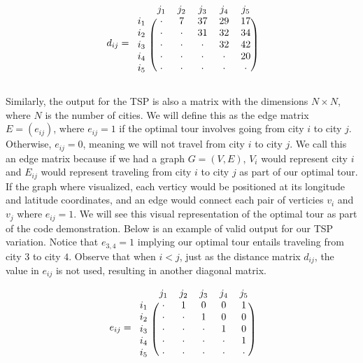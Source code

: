 \documentclass{article}
\begin{document}
\begin{align*}
  d_{ij}=
  \begin{blockarray}{cccccc}
    & j_1 & j_2 & j_3 & j_4 & j_5 \\
  \begin{block}{c(ccccc)}
    i_1 & \cdot & 7 & 37 & 29 & 17 \\
    i_2 & \cdot & \cdot & 31 & 32 & 34 \\
    i_3 & \cdot & \cdot & \cdot & 32 & 42 \\
    i_4 & \cdot & \cdot & \cdot & \cdot & 20 \\
    i_5 & \cdot & \cdot & \cdot & \cdot & \cdot \\
  \end{block}
  \end{blockarray}
\end{align*}

Similarly, the output for the TSP is also a matrix with the dimensions
$N\times N$, where $N$ is the number of cities.  We will define this as
the edge matrix $E = (e_{ij})$, where $e_{ij}=1$ if the optimal tour involves
going from city $i$ to city $j$.  Otherwise, $e_{ij}=0$, meaning we will not
travel from city $i$ to city $j$.  We call this an edge matrix because if
we had a graph $G=(V,E)$, $V_i$ would represent city $i$ and $E_{ij}$ would
represent traveling from city $i$ to city $j$ as part of our optimal tour.
If the graph where visualized, each verticy would be positioned at its
longitude and latitude coordinates, and an edge would connect each pair of
verticies $v_i$ and $v_j$ where $e_{ij}=1$.  We will see this visual
representation of the optimal tour as part of the code demonstration.
Below is an example of valid output for our TSP variation.  Notice that
$e_{3,4}=1$ implying our optimal tour entails traveling from city $3$ to
city $4$.  Observe that when $i<j$, just as the distance matrix $d_{ij}$,
the value in $e_{ij}$ is not used, resulting in another diagonal matrix.
\par

\begin{align*}
  e_{ij}=
  \begin{blockarray}{cccccc}
    & j_1 & j_2 & j_3 & j_4 & j_5 \\
  \begin{block}{c(ccccc)}
    i_1 & \cdot & 1 & 0 & 0 & 1 \\ 
    i_2 & \cdot & \cdot & 1 & 0 & 0 \\
    i_3 & \cdot & \cdot & \cdot & 1 & 0 \\
    i_4 & \cdot & \cdot & \cdot & \cdot & 1 \\
    i_5 & \cdot & \cdot & \cdot & \cdot & \cdot \\
  \end{block}
  \end{blockarray}
\end{align*}
\end{document}
